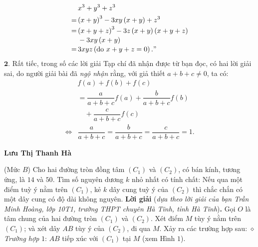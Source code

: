 \begin{multicols}{2}
\begin{align*}
			&{x^3} + {y^3} + {z^3}\\
			= \,&{\left( {x + y} \right)^3} - 3xy\left( {x + y} \right) + {z^3}\\[-0.4ex]
			= \,&{\left( {x + y + z} \right)^3} - 3z\left( {x + y} \right)\left( {x + y + z} \right) \\[-0.4ex]
			&- 3xy\left( {x + y} \right)\\[-0.4ex]
			= \,&3xyz\left( {{\text{do }}x + y + z = 0} \right)."
	\end{align*}
	$\pmb{2.}$ Rất tiếc, trong số các lời giải Tạp chí đã nhận được từ bạn đọc, có hai lời giải sai, do người giải bài đã \textit{ngộ nhận} rằng, với giả thiết $a + b + c \ne 0$, ta có:
	\begin{align*}
		&f\left( a \right) + f\left( b \right) + f\left( c \right) \\[-0.4ex]
		&= \dfrac{a}{{a + b + c}}f\left( a \right) + \dfrac{b}{{a + b + c}}f\left( b \right) \\[-0.4ex]
		&\quad+ \dfrac{c}{{a + b + c}}f\left( c \right)\\[-0.4ex]
		\Leftrightarrow &\dfrac{a}{{a + b + c}} = \dfrac{b}{{a + b + c}} = \dfrac{c}{{a + b + c}} = 1.
	\end{align*}
	\begin{flushright}
		\textbf{\color{thachthuctoanhoc}Lưu Thị Thanh Hà}
	\end{flushright}
	{}
	(Mức $B$) Cho hai đường tròn đồng tâm $(C_1)$ và $(C_2)$, có bán kính, tương ứng, là $14$ và $50$. Tìm số nguyên dương $k$ nhỏ nhất có tính chất: Nếu qua một điểm tuỳ ý nằm trên $(C_1)$, kẻ $k$ dây cung tuỳ ý của $(C_2)$ thì chắc chắn có một dây cung có độ dài không nguyên. 
	\vskip 0.05cm
	\textbf{\color{thachthuctoanhoc}Lời giải} (\textit{dựa theo lời giải của bạn Trần Minh Hoàng, lớp 10T1, trường THPT chuyên Hà Tĩnh, tỉnh Hà Tĩnh})\textbf{\color{thachthuctoanhoc}.}
	\vskip 0.05cm
	Gọi $O$ là tâm chung của hai đường tròn $(C_1)$ và $(C_2)$.
	\vskip 0.05cm 
	Xét điểm $M$ tùy ý nằm trên  $(C_1)$; và xét dây $AB$ tùy ý của $(C_2)$, đi qua $M$. Xảy ra các trường hợp sau:
	\vskip 0.05cm
	$\diamond$ \textit{Trường hợp} $1$: $AB$ tiếp xúc với  $(C_1)$ tại $M$ (xem Hình $1$).
	\begin{figure}[H]
		\vspace*{-5pt}
		\centering
		\captionsetup{labelformat= empty, justification=centering}

\end{figure}
\end{multicols}
